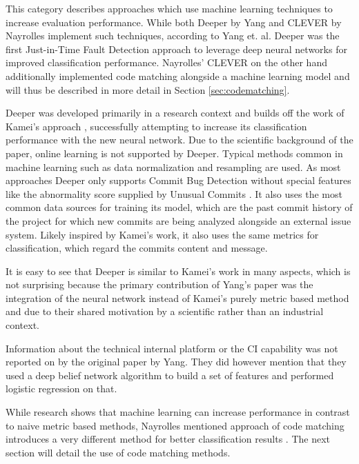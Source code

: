 This category describes approaches which use machine learning techniques to increase evaluation performance.
While both Deeper by Yang \cite{Yang2015} and CLEVER by Nayrolles \cite{Nayrolles2018} implement such techniques, according to Yang et. al. Deeper was the first Just-in-Time Fault Detection approach to leverage deep neural networks for improved classification performance. Nayrolles' CLEVER on the other hand additionally implemented code matching alongside a machine learning model and will thus be described in more detail in Section \ref{sec:codematching}.

Deeper was developed primarily in a research context and builds off the work of Kamei's approach \cite{Kamei2013}, successfully attempting to increase its classification performance with the new neural network. Due to the scientific background of the paper, online learning is not supported by Deeper. Typical methods common in machine learning such as data normalization and resampling are used. As most approaches Deeper only supports Commit Bug Detection without special features like the abnormality score supplied by Unusual Commits \cite{Goyal2017}. It also uses the most common data sources for training its model, which are the past commit history of the project for which new commits are being analyzed alongside an external issue system. Likely inspired by Kamei's work, it also uses the same metrics for classification, which regard the commits content and message. 

It is easy to see that Deeper is similar to Kamei's work in many aspects, which is not surprising because the primary contribution of Yang's paper was the integration of the neural network instead of Kamei's purely metric based method and 
due to their shared motivation by a scientific rather than an industrial context.

Information about the technical internal platform or the CI capability was not reported on by the original paper by Yang. They did however mention that they used a deep belief network algorithm to build a set of features and performed logistic regression on that.

While research shows that machine learning can increase performance in contrast to naive metric based methods, Nayrolles mentioned approach of code matching introduces a very different method for better classification results \cite{Nayrolles2018}. The next section will detail the use of code matching methods.


